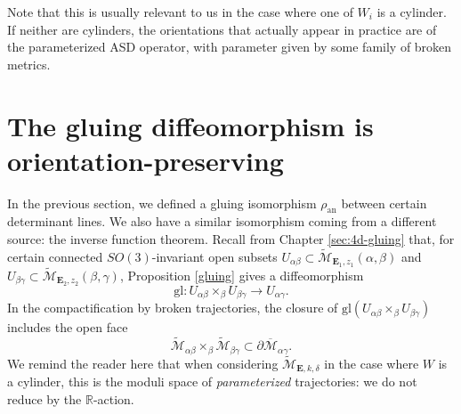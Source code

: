 \documentclass[10pt,a4paper]{amsart}
\theoremstyle{definition}
\theoremstyle{remark}
\numberwithin{figure}{qchap}
\begin{document}
Note that this is usually relevant to us in the case where one of $W_i$ is a cylinder. If neither are cylinders, the orientations that actually appear in practice are of the parameterized ASD operator, with parameter given by some family of broken metrics. 

\section{The gluing diffeomorphism is orientation-preserving}\label{sec:or-gluing2}
In the previous section, we defined a gluing isomorphism $\rho_{\text{an}}$ between certain determinant lines. We also have a similar isomorphism coming from a different source: the inverse function theorem. Recall from Chapter \ref{sec:4d-gluing} that, for certain connected $SO(3)$-invariant open subsets $U_{\alpha \beta} \subset \widetilde{\mathcal M}_{\mathbf{E}_1,z_1}(\alpha, \beta)$ and $U_{\beta \gamma} \subset \widetilde{\mathcal M}_{\mathbf{E}_2, z_2}(\beta, \gamma)$, Proposition \ref{gluing} gives a diffeomorphism 
$$\text{gl}: U_{\alpha \beta} \times_\beta U_{\beta \gamma} \to U_{\alpha \gamma}.$$ 
In the compactification by broken trajectories, the closure of $\text{gl}(U_{\alpha \beta} \times_\beta U_{\beta \gamma})$ includes the open face 
$$\widetilde{\mathcal M}_{\alpha \beta} \times_\beta \widetilde{\mathcal M}_{\beta \gamma} \subset \partial \overline{\mathcal M}_{\alpha \gamma}.$$ 
We remind the reader here that when considering $\widetilde{\mathcal M}_{\mathbf{E}, k, \delta}$ in the case where $W$ is a cylinder, this is the moduli space of \emph{parameterized} trajectories: we do not reduce by the $\mathbb R$-action.
\end{document}
